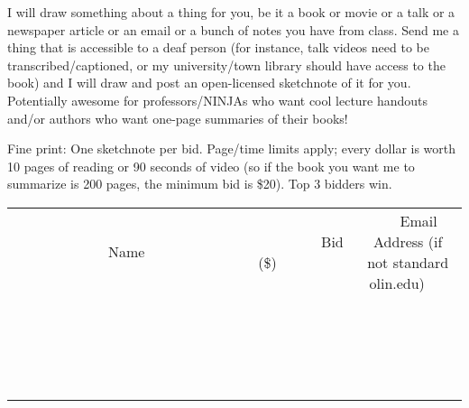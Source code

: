 \documentclass[11pt]{article}
\begin{document}
I will draw something about a thing for you, be it a book or movie or a talk or a newspaper article or an email or a bunch of notes you have from class. Send me a thing that is accessible to a deaf person (for instance, talk videos need to be transcribed/captioned, or my university/town library should have access to the book) and I will draw and post an open-licensed sketchnote of it for you. Potentially awesome for professors/NINJAs who want cool lecture handouts and/or authors who want one-page summaries of their books!

Fine print: One sketchnote per bid. Page/time limits apply; every dollar is worth 10 pages of reading or 90 seconds of video (so if the book you want me to summarize is 200 pages, the minimum bid is \$20). Top 3 bidders win.
\\[3ex]
\begin{tabular}{c c c}
~~~~~~~~~~~~~Name~~~~~~~~~~~~~ & ~~~~~~~~~Bid (\$)~~~~~~~~~  & ~~~Email Address (if not standard olin.edu)~~~\\
 & & \\
\hline
 & & \\
\hline
 & & \\
\hline
 & & \\
\hline
 & & \\
\hline
 & & \\
\hline
 & & \\
\hline
 & & \\
\hline
 & & \\
\hline
 & & \\
\hline
 & & \\
\hline
 & & \\
\hline
 & & \\
\hline
 & & \\
\hline
 & & \\
\hline
 & & \\
\hline
 & & \\
\hline
 & & \\
\hline
 & & \\
\hline
\end{tabular}
\newpage
\end{document}
